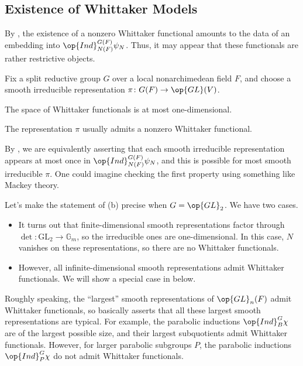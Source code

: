 \documentclass[../notes.tex]{subfiles}
\begin{document}
\subsection{Existence of Whittaker Models}
By , the existence of a nonzero Whittaker functional amounts to the data of an embedding into $\op{Ind}_{N(F)}^{G(F)}\psi_N$. Thus, it may appear that these functionals are rather restrictive objects.
\begin{theorem} \label{thm:whittaker-exists}
	Fix a split reductive group $G$ over a local nonarchimedean field $F$, and choose a smooth irreducible representation $\pi\colon G(F)\to\op{GL}(V)$.
	\begin{listalph}
		\item The space of Whittaker functionals is at most one-dimensional.
		\item The representation $\pi$ usually admits a nonzero Whittaker functional.
	\end{listalph} 
\end{theorem}
\begin{remark}
	By , we are equivalently asserting that each smooth irreducible representation appears at most once in $\op{Ind}_{N(F)}^{G(F)}\psi_N$, and this is possible for most smooth irreducible $\pi$. One could imagine checking the first property using something like Mackey theory.
\end{remark}
\begin{example}
	Let's make the statement of (b) precise when $G=\op{GL}_2$. We have two cases.
	\begin{itemize}
		\item It turns out that finite-dimensional smooth representations factor through $\det\colon\mathrm{GL}_2\to\mathbb G_m$, so the irreducible ones are one-dimensional. In this case, $N$ vanishes on these representations, so there are no Whittaker functionals.
		\item However, all infinite-dimensional smooth representations admit Whittaker functionals. We will show a special case in  below.
	\end{itemize}
\end{example}
\begin{example}
	Roughly speaking, the ``largest'' smooth representations of $\op{GL}_n(F)$ admit Whittaker functionals, so  basically asserts that all these largest smooth representations are typical. For example, the parabolic inductions $\op{Ind}_B^G\chi$ are of the largest possible size, and their largest subquotients admit Whittaker functionals. However, for larger parabolic subgroups $P$, the parabolic inductions $\op{Ind}_P^G\chi$ do not admit Whittaker functionals.
\end{example}
\end{document}
